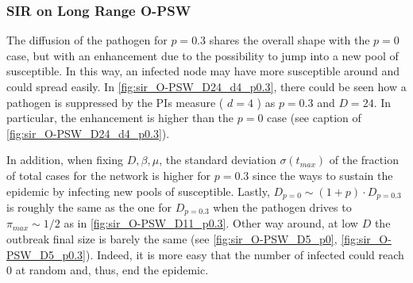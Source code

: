 \documentclass[a4paper,10pt,twoside]{book} %
\theoremstyle{definition}
\begin{document}
\clearpage
\subsubsection*{SIR on Long Range O-PSW}
The diffusion of the pathogen for $p = 0.3$ shares the overall shape with the $p = 0$ case, but with an enhancement due to the possibility to jump into a new pool of susceptible. In this way, an infected node may have more susceptible around and could spread easily.
In \autoref{fig:sir_O-PSW_D24_d4_p0.3}, there could be seen how a pathogen is suppressed by the PIs measure ( $ d = 4$ ) as $ p=0.3$ and $ D = 24$. In particular, the enhancement is higher than the $p=0$ case (see caption of \autoref{fig:sir_O-PSW_D24_d4_p0.3}).

In addition, when fixing $D, \beta, \mu$, the standard deviation $\sigma(t_{max})$ of the fraction of total cases for the network is higher for $p = 0.3$ since the ways to sustain the epidemic by infecting new pools of susceptible.
Lastly, $D_{p=0} \sim (1+p) \cdot D_{p=0.3}$ is roughly the same as the one for $D_{p=0.3}$ when the pathogen drives to $ \pi_{max} \sim 1/2$ as in \autoref{fig:sir_O-PSW_D11_p0.3}. Other way around, at low $D$ the outbreak final size is barely the same (see \autoref{fig:sir_O-PSW_D5_p0}, \autoref{fig:sir_O-PSW_D5_p0.3}). Indeed, it is more easy that the number of infected could reach $ 0$ at random and, thus, end the epidemic. 
\end{document}
